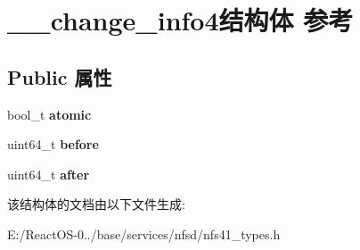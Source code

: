 \hypertarget{struct____change__info4}{}\section{\+\_\+\+\_\+change\+\_\+info4结构体 参考}
\label{struct____change__info4}
\subsection*{Public 属性}
\begin{DoxyCompactItemize}
\item 
\mbox{\label{struct____change__info4_a052f9acca7fb57723beb85e833aa2a63}} 
bool\+\_\+t {\bfseries atomic}
\item 
\mbox{\label{struct____change__info4_ac873f758aa03b4944b10a1a0b006bf76}} 
uint64\+\_\+t {\bfseries before}
\item 
\mbox{\label{struct____change__info4_a42af05f64bd94d488d8f1aeccb76d997}} 
uint64\+\_\+t {\bfseries after}
\end{DoxyCompactItemize}


该结构体的文档由以下文件生成\+:\begin{DoxyCompactItemize}
\item 
E\+:/\+React\+O\+S-\/0../base/services/nfsd/nfs41\+\_\+types.\+h\end{DoxyCompactItemize}
